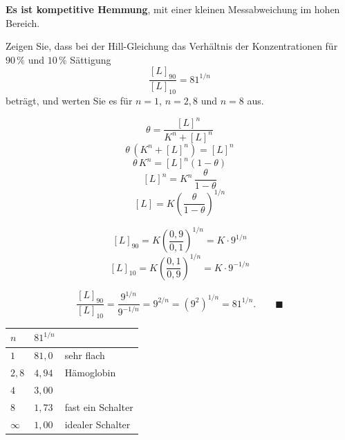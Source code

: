 \begin{aufgabe}
\textbf{Es ist kompetitive Hemmung}, mit einer kleinen Messabweichung im hohen Bereich.

\begin{center}
\begin{minipage}{0.88\textwidth}
\end{minipage}
\end{center}
\end{aufgabe}

\begin{aufgabe}
Zeigen Sie, dass bei der Hill-Gleichung das Verhältnis der Konzentrationen für $90\,\%$ und $10\,\%$ Sättigung
\[ \frac{[L]_{90}}{[L]_{10}} = 81^{1/n} \]
beträgt, und werten Sie es für $n=1$, $n=2{,}8$ und $n=8$ aus.

\loesung
{}
\[ \theta = \frac{[L]^n}{K^n+[L]^n} \]
\[ \theta\,(K^n+[L]^n) = [L]^n \]
\[ \theta\,K^n = [L]^n(1-\theta) \]
\[ [L]^n = K^n\,\frac{\theta}{1-\theta} \]
\[ [L] = K\left(\frac{\theta}{1-\theta}\right)^{1/n} \]

\[ [L]_{90} = K\left(\frac{0{,}9}{0{,}1}\right)^{1/n} = K\cdot 9^{1/n} \]
\[ [L]_{10} = K\left(\frac{0{,}1}{0{,}9}\right)^{1/n} = K\cdot 9^{-1/n} \]

\[ \frac{[L]_{90}}{[L]_{10}} = \frac{9^{1/n}}{9^{-1/n}} = 9^{2/n} = \left(9^2\right)^{1/n} = 81^{1/n} . \qquad \blacksquare \]

\begin{center}
\renewcommand{\arraystretch}{1.48}
\begin{tabular}{@{}P{1.6cm}P{2.4cm}P{3.0cm}@{}}
\toprule
$n$ & $81^{1/n}$ & \\
\midrule
$1$ & $81{,}0$ & \textcolor{akzent}{sehr flach}\\
$2{,}8$ & $4{,}94$ & Hämoglobin\\
$4$ & $3{,}00$ & \\
$8$ & $1{,}73$ & \textcolor{gruen}{fast ein Schalter}\\
$\infty$ & $1{,}00$ & idealer Schalter\\
\bottomrule
\end{tabular}
\end{center}


\end{aufgabe}
